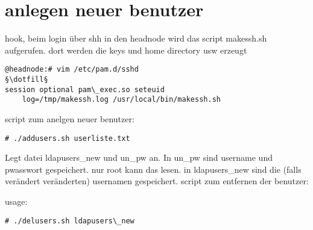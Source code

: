\section{anlegen neuer benutzer}
hook, beim login über shh in den headnode wird das script makessh.sh aufgerufen.
dort werden die keys und home directory usw erzeugt
\begin{lstlisting}[style=Bash]
@headnode:# vim /etc/pam.d/sshd
§\dotfill§
session optional pam\_exec.so seteuid 
    log=/tmp/makessh.log /usr/local/bin/makessh.sh
\end{lstlisting}
script zum anelgen neuer benutzer:

\begin{lstlisting}[style=Bash]
# ./addusers.sh userliste.txt 
\end{lstlisting}
Legt datei ldapusers\_new und un\_pw an.
In un\_pw sind username und pwasswort gespeichert. nur root kann das lesen. in ldapusers\_new sind die (falls verändert veränderten) usernamen gespeichert.
script zum entfernen der benutzer:

usage:
\begin{lstlisting}[style=Bash]
# ./delusers.sh ldapusers\_new
\end{lstlisting}


